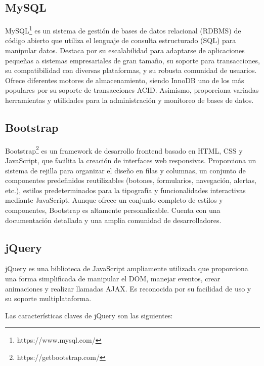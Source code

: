 \documentclass[a4paper, 12pt]{book}
\begin{document}
\subsection{MySQL}
\label{subsec:mysql} MySQL\footnote{https://www.mysql.com/} es un sistema de gestión de bases de datos relacional (RDBMS) de código abierto que utiliza el lenguaje de consulta estructurado (SQL) 
para manipular datos. Destaca por su escalabilidad para adaptarse de aplicaciones pequeñas a sistemas empresariales de gran tamaño, su soporte para transacciones, 
su compatibilidad con diversas plataformas, y su robusta comunidad de usuarios. Ofrece diferentes motores de almacenamiento, siendo InnoDB uno de los más populares 
por su soporte de transacciones ACID. Asimismo, proporciona variadas herramientas y utilidades para la administración y monitoreo de bases de datos.


\subsection{Bootstrap}
\label{subsec:bootstrap} Bootstrap\footnote{https://getbootstrap.com/} es un framework de desarrollo frontend basado en HTML, CSS y JavaScript, que facilita la creación de interfaces web responsivas. 
Proporciona un sistema de rejilla para organizar el diseño en filas y columnas, un conjunto de componentes predefinidos reutilizables (botones, formularios, navegación, 
alertas, etc.), estilos predeterminados para la tipografía y funcionalidades interactivas mediante JavaScript. Aunque ofrece un conjunto completo de estilos y 
componentes, Bootstrap es altamente personalizable. Cuenta con una documentación detallada y una amplia comunidad de desarrolladores.

\subsection{jQuery}
\label{subsec:jquery}
jQuery es una biblioteca de JavaScript ampliamente utilizada que proporciona una forma simplificada de manipular el DOM, manejar eventos, crear animaciones y realizar llamadas AJAX. Es reconocida por su facilidad de uso y su soporte multiplataforma. 

Las características claves de jQuery son las siguientes:
\end{document}
